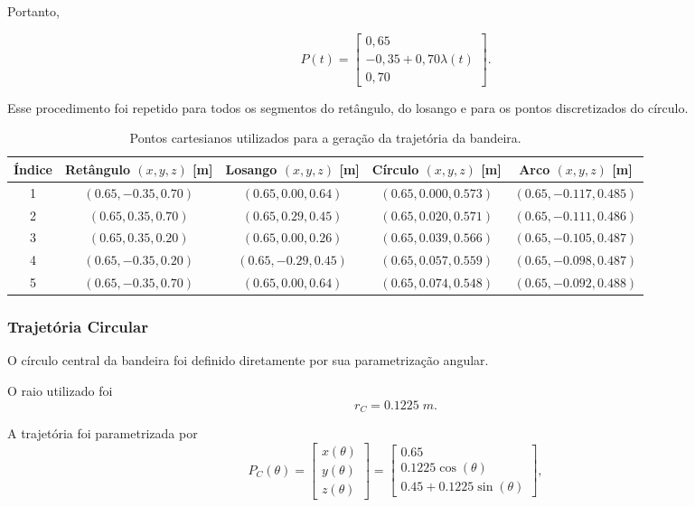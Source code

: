 Portanto,

\[
P(t)
=
\begin{bmatrix}
0,65\\
-0,35+0,70\lambda(t)\\
0,70
\end{bmatrix}.
\]

Esse procedimento foi repetido para todos os segmentos do retângulo, do losango e para os pontos discretizados do círculo.

\begin{table}[H]
\centering
\caption{Pontos cartesianos utilizados para a geração da trajetória da bandeira.}
\label{tab:pontos_bandeira}
\begin{tabular}{c|c|c|c|c}
\hline
Índice &
Retângulo $(x,y,z)$ [m] &
Losango $(x,y,z)$ [m] &
Círculo $(x,y,z)$ [m] &
Arco $(x,y,z)$ [m]\\
\hline

1 &
$(0.65,-0.35,0.70)$ &
$(0.65,0.00,0.64)$ &
$(0.65,0.000,0.573)$ &
$(0.65,-0.117,0.485)$ \\

2 &
$(0.65,0.35,0.70)$ &
$(0.65,0.29,0.45)$ &
$(0.65,0.020,0.571)$ &
$(0.65,-0.111,0.486)$ \\

3 &
$(0.65,0.35,0.20)$ &
$(0.65,0.00,0.26)$ &
$(0.65,0.039,0.566)$ &
$(0.65,-0.105,0.487)$ \\

4 &
$(0.65,-0.35,0.20)$ &
$(0.65,-0.29,0.45)$ &
$(0.65,0.057,0.559)$ &
$(0.65,-0.098,0.487)$ \\

5 &
$(0.65,-0.35,0.70)$ &
$(0.65,0.00,0.64)$ &
$(0.65,0.074,0.548)$ &
$(0.65,-0.092,0.488)$ \\

\hline
\end{tabular}
\end{table}

\subsubsection{Trajetória Circular}

O círculo central da bandeira foi definido diretamente por sua parametrização angular.
\par O raio utilizado foi
\[
r_C = 0.1225\;m.
\]

A trajetória foi parametrizada por
\[
P_C(\theta)=
\begin{bmatrix}
x(\theta)\\
y(\theta)\\
z(\theta)
\end{bmatrix}
=
\begin{bmatrix}
0.65\\
0.1225\cos(\theta)\\
0.45+0.1225\sin(\theta)
\end{bmatrix},
\]


